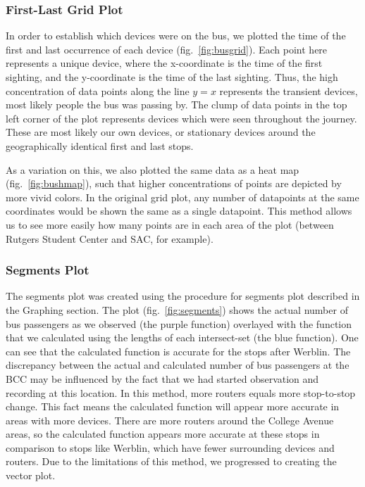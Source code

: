 \subsubsection*{First-Last Grid Plot}

In order to establish which devices were on the bus, we plotted the time of the first and last occurrence of each device (fig.~\ref{fig:busgrid}).
Each point here represents a unique device, where the x-coordinate is the time of the first sighting, and the y-coordinate is the time of the last sighting.
Thus, the high concentration of data points along the line \(y=x\) represents the transient devices, most likely people the bus was passing by.
The clump of data points in the top left corner of the plot represents devices which were seen throughout the journey.
These are most likely our own devices, or stationary devices around the geographically identical first and last stops.

As a variation on this, we also plotted the same data as a heat map (fig.~\ref{fig:bushmap}), such that higher concentrations of points are depicted by more vivid colors.
In the original grid plot, any number of datapoints at the same coordinates would be shown the same as a single datapoint.
This method allows us to see more easily how many points are in each area of the plot (between Rutgers Student Center and SAC, for example).

\subsubsection*{Segments Plot}
The segments plot was created using the procedure for segments plot described in the Graphing section.
The plot (fig.~\ref{fig:segments}) shows the actual number of bus passengers as we observed (the purple function) overlayed with the function that we calculated using the lengths of each intersect-set (the blue function).
One can see that the calculated function is accurate for the stops after Werblin.
The discrepancy between the actual and calculated number of bus passengers at the BCC may be influenced by the fact that we had started observation and recording at this location. In this method, more routers equals more stop-to-stop change.
This fact means the calculated function will appear more accurate in areas with more devices.
There are more routers around the College Avenue areas, so the calculated function appears more accurate at these stops in comparison to stops like Werblin, which have fewer surrounding devices and routers.
Due to the limitations of this method, we progressed to creating the vector plot.

